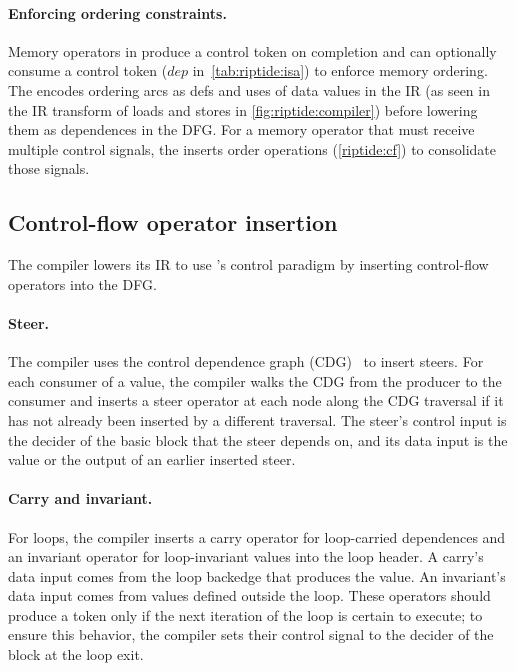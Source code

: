 \paragraph{Enforcing ordering constraints.} 
Memory operators in \riptide 
produce a control token on completion and can optionally consume a
control token ($dep$ in~\autoref{tab:riptide:isa}) to enforce memory ordering.
%
The \mend encodes ordering arcs as defs and uses of data values in the IR
(as seen in the IR transform of loads and stores in \autoref{fig:riptide:compiler})
before lowering them as dependences in the DFG.
%
For a memory operator that must receive multiple control signals,
the \mend inserts order operations (\autoref{riptide:cf}) to consolidate those signals.

\subsection{Control-flow operator insertion}

The compiler lowers its IR to use \riptide's control paradigm by inserting \riptide
control-flow operators into the DFG.
%

\paragraph{Steer.}
%
The compiler uses the control dependence graph (CDG)~\cite{cytron} to 
insert steers.
%
For each consumer of a value, the compiler walks the CDG from the producer
to the consumer
and inserts a steer operator at
each node along the CDG traversal if it has not already been inserted by a different traversal. 
%
% 
The steer's control input is the decider of the basic block that the steer depends on,
and its data input is the value or the output of an earlier inserted steer.
%

\paragraph{Carry and invariant.}
%
For loops, the compiler inserts a carry operator for loop-carried dependences
and an invariant operator for loop-invariant values
into the loop header.
%
A carry's data
input comes from the loop backedge that produces the value.  An invariant's
data input comes from values defined outside the loop.
%
These operators should produce a token only if the next iteration of the loop is
certain to execute; to ensure this behavior, the compiler sets their control
signal to the decider of the block at the loop exit. 
%

